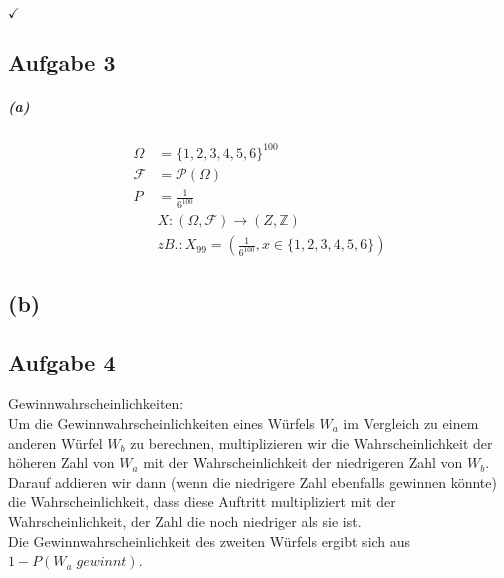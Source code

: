 \documentclass[a4paper]{scrartcl}
\begin{document}
$\checkmark$


\subsection*{Aufgabe 3}
\subparagraph*{(a)}
\begin{align*}
	\Omega &= \lbrace 1,2,3,4,5,6 \rbrace^{100}\\
	\mathcal{F} &= \mathcal{P}(\Omega)\\
	P &= \frac{1}{6^{100}}\\
	&X:(\Omega, \mathcal{F}) \rightarrow (Z, \mathbb{Z})\\
	&zB.: X_{99} = (\frac{1}{6^{100}}, x \in \lbrace 1,2,3,4,5,6 \rbrace)	
\end{align*}


\subsection*{(b)}








\subsection*{Aufgabe 4}
Gewinnwahrscheinlichkeiten:\\
Um die Gewinnwahrscheinlichkeiten eines Würfels $W_a$ im Vergleich zu einem anderen Würfel $W_b$ zu berechnen, multiplizieren wir die Wahrscheinlichkeit der höheren Zahl von $W_a$ mit der Wahrscheinlichkeit der niedrigeren Zahl von $W_b$. Darauf addieren wir dann (wenn die niedrigere Zahl ebenfalls gewinnen könnte) die Wahrscheinlichkeit, dass diese Auftritt multipliziert mit der Wahrscheinlichkeit, der Zahl die noch niedriger als sie ist.\\
Die Gewinnwahrscheinlichkeit des zweiten Würfels ergibt sich aus $1-P(W_a\;gewinnt)$.\\
\end{document}
